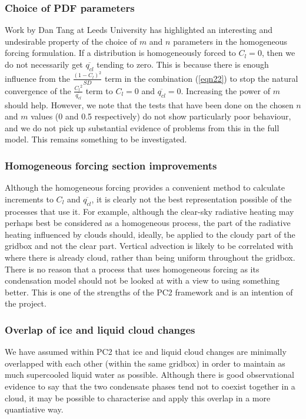\documentclass{UMDP_article}
\begin{document}
\subsubsection{Choice of PDF parameters}
Work by Dan Tang at Leeds University has highlighted an interesting
and undesirable property of the choice of $m$ and $n$ parameters in the
homogeneous forcing formulation. If a distribution is homogeneously
forced to $C_l = 0$, then we do not necessarily get $\overline{q_{cl}}$
tending to zero. This is because there is enough influence from the
$\frac{{(1-C_l)}^2}{SD}$ term in the combination (\ref{eqn22}) to
stop the natural convergence of the $\frac{{C_l}^2}{\overline{q_{cl}}}$ term
to $C_l =0$ and $\overline{q_{cl}}=0$. Increasing the power of $m$ should
help. However, we note that the tests that have been done on the chosen
$n$ and $m$ values (0 and 0.5 respectively) do not show particularly
poor behaviour, and we do not pick up substantial evidence of problems
from this in the full model. This remains something to be investigated.

\subsubsection{Homogeneous forcing section improvements}
\label{sec:homog_improve}
Although the homogeneous forcing provides a convenient method to
calculate increments to $C_l$ and $\overline{q_{cl}}$, it is clearly
not the best representation possible of the processes that use it.
For example, although the clear-sky radiative heating may perhaps
best be considered as a homogeneous process, the part of the
radiative heating influenced by clouds should, ideally, be applied
to the cloudy part of the gridbox and not the clear part. Vertical
advection is likely to be correlated with where there is already
cloud, rather than being uniform throughout the gridbox. There is
no reason that a process that uses homogeneous forcing as its
condensation model should not be looked at with a view to using
something better. This is one of the strengths of the PC2 framework and
is an intention of the project.

\subsubsection{Overlap of ice and liquid cloud changes}
We have assumed within PC2 that ice and liquid cloud changes are
minimally overlapped with each other (within the same gridbox) in
order to maintain as much supercooled liquid water as possible. Although
there is good observational evidence to say that the two condensate
phases tend not to coexist together in a cloud, it may be possible to
characterise and apply this overlap in a more quantiative way.
\end{document}
